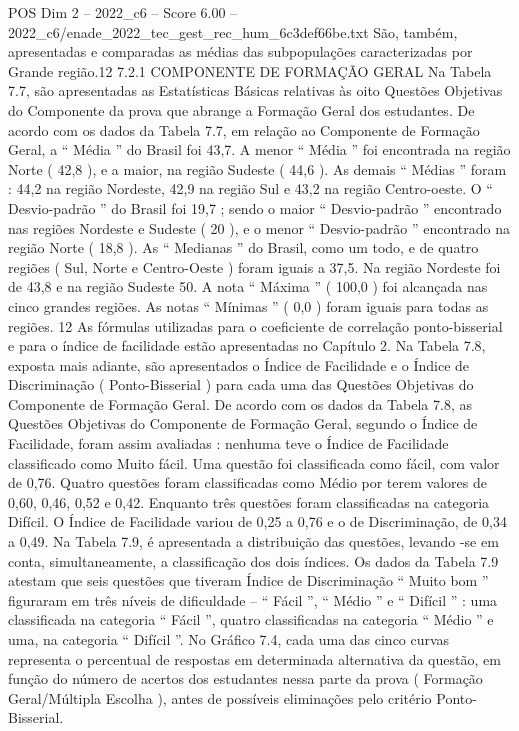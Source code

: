 \begin{textsample}{POS Dim 2 – 2022\_c6 – Score 6.00 – 2022\_c6/enade\_2022\_tec\_gest\_rec\_hum\_6c3def66be.txt}
São, também, apresentadas e comparadas as médias das subpopulações caracterizadas por Grande região.12 7.2.1 COMPONENTE DE FORMAÇÃO GERAL Na Tabela 7.7, são apresentadas as Estatísticas Básicas relativas às oito Questões Objetivas do Componente da prova que abrange a Formação Geral dos estudantes.
De acordo com os dados da Tabela 7.7, em relação ao Componente de Formação Geral, a “ Média ” do Brasil foi 43,7.
A menor “ Média ” foi encontrada na região Norte ( 42,8 ), e a maior, na região Sudeste ( 44,6 ).
As demais “ Médias ” foram : 44,2 na região Nordeste, 42,9 na região Sul e 43,2 na região Centro-oeste.
O “ Desvio-padrão ” do Brasil foi 19,7 ; sendo o maior “ Desvio-padrão ” encontrado nas regiões Nordeste e Sudeste ( 20 ), e o menor “ Desvio-padrão ” encontrado na região Norte ( 18,8 ).
As “ Medianas ” do Brasil, como um todo, e de quatro regiões ( Sul, Norte e Centro-Oeste ) foram iguais a 37,5.
Na região Nordeste foi de 43,8 e na região Sudeste 50.
A nota “ Máxima ” ( 100,0 ) foi alcançada nas cinco grandes regiões.
As notas “ Mínimas ” ( 0,0 ) foram iguais para todas as regiões. 12 As fórmulas utilizadas para o coeficiente de correlação ponto-bisserial e para o índice de facilidade estão apresentadas no Capítulo 2.
Na Tabela 7.8, exposta mais adiante, são apresentados o Índice de Facilidade e o Índice de Discriminação ( Ponto-Bisserial ) para cada uma das Questões Objetivas do Componente de Formação Geral.
De acordo com os dados da Tabela 7.8, as Questões Objetivas do Componente de Formação Geral, segundo o Índice de Facilidade, foram assim avaliadas : nenhuma teve o Índice de Facilidade classificado como Muito fácil.
Uma questão foi classificada como fácil, com valor de 0,76.
Quatro questões foram classificadas como Médio por terem valores de 0,60, 0,46, 0,52 e 0,42.
Enquanto três questões foram classificadas na categoria Difícil.
O Índice de Facilidade variou de 0,25 a 0,76 e o de Discriminação, de 0,34 a 0,49.
Na Tabela 7.9, é apresentada a distribuição das questões, levando -se em conta, simultaneamente, a classificação dos dois índices.
Os dados da Tabela 7.9 atestam que seis questões que tiveram Índice de Discriminação “ Muito bom ” figuraram em três níveis de dificuldade – “ Fácil ”, “ Médio ” e “ Difícil ” : uma classificada na categoria “ Fácil ”, quatro classificadas na categoria “ Médio ” e uma, na categoria “ Difícil ”.
No Gráfico 7.4, cada uma das cinco curvas representa o percentual de respostas em determinada alternativa da questão, em função do número de acertos dos estudantes nessa parte da prova ( Formação Geral/Múltipla Escolha ), antes de possíveis eliminações pelo critério Ponto-Bisserial.

\end{textsample}
